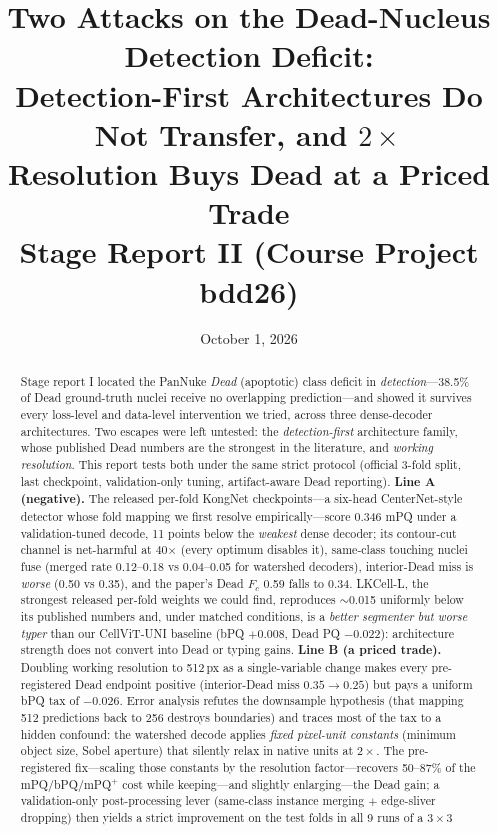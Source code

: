 \documentclass[11pt]{article}
\title{\bfseries Two Attacks on the Dead-Nucleus Detection Deficit:\\
Detection-First Architectures Do Not Transfer, and $2\times$\\
Resolution Buys Dead at a Priced Trade\\[6pt]
\large Stage Report II (Course Project bdd26)}
\author{}
\date{October 1, 2026}
\begin{document}
\maketitle


\begin{abstract}
Stage report I located the PanNuke \emph{Dead} (apoptotic) class deficit in
\emph{detection}---38.5\% of Dead ground-truth nuclei receive no overlapping prediction---and
showed it survives every loss-level and data-level intervention we tried, across three
dense-decoder architectures. Two escapes were left untested: the \emph{detection-first}
architecture family, whose published Dead numbers are the strongest in the literature, and
\emph{working resolution}. This report tests both under the same strict protocol (official
3-fold split, last checkpoint, validation-only tuning, artifact-aware Dead reporting).
\textbf{Line A (negative).} The released per-fold KongNet checkpoints---a six-head
CenterNet-style detector whose fold mapping we first resolve empirically---score 0.346 mPQ
under a validation-tuned decode, 11 points below the \emph{weakest} dense decoder; its
contour-cut channel is net-harmful at 40$\times$ (every optimum disables it), same-class
touching nuclei fuse (merged rate 0.12--0.18 vs 0.04--0.05 for watershed decoders),
interior-Dead miss is \emph{worse} (0.50 vs 0.35), and the paper's Dead $F_c$ 0.59 falls to
0.34. LKCell-L, the strongest released per-fold weights we could find, reproduces
$\sim$0.015 uniformly below its published numbers and, under matched conditions, is a
\emph{better segmenter but worse typer} than our CellViT-UNI baseline (bPQ $+$0.008, Dead PQ
$-$0.022): architecture strength does not convert into Dead or typing gains. \textbf{Line B
(a priced trade).} Doubling working resolution to 512\,px as a single-variable change makes
every pre-registered Dead endpoint positive (interior-Dead miss $0.35\!\to\!0.25$) but pays a
uniform bPQ tax of $-$0.026. Error analysis refutes the downsample hypothesis (that mapping
512 predictions back to 256 destroys boundaries) and traces most of the tax to a hidden
confound: the watershed decode applies \emph{fixed pixel-unit constants} (minimum object
size, Sobel aperture) that silently relax in native units at $2\times$. The pre-registered
fix---scaling those constants by the resolution factor---recovers 50--87\% of the
mPQ/bPQ/mPQ$^+$ cost while keeping---and slightly enlarging---the Dead gain; a
validation-only post-processing lever (same-class instance merging $+$ edge-sliver dropping)
then yields a strict improvement on the test folds in all 9 runs of a $3{\times}3$

\end{abstract}
\end{document}

